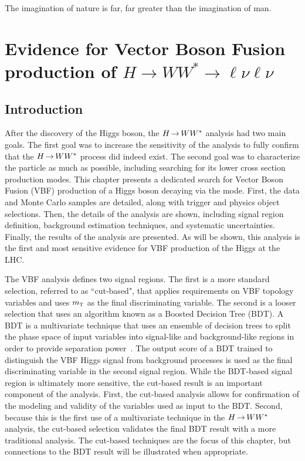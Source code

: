 \begin{savequote}[75mm]
The imagination of nature is far, far greater than the imagination of man.
\end{savequote}

\chapter{Evidence for Vector Boson Fusion production of $H\rightarrow WW^{*}\rightarrow \ell\nu\ell\nu$}

\section{Introduction}

After the discovery of the Higgs boson, the $H{\,{\rightarrow}\,}WW^\ast$ analysis had two main goals. The first goal was to increase the sensitivity of the analysis to fully confirm that the $H{\,{\rightarrow}\,}WW^\ast$ process did indeed exist. The second goal was to characterize the particle as much as possible, including searching for its lower cross section production modes.  This chapter presents a dedicated search for Vector Boson Fusion (VBF) production of a Higgs boson decaying via the \HWWfull mode. First, the data and Monte Carlo samples are detailed, along with trigger and physics object selections. Then, the details of the analysis are shown, including signal region definition, background estimation techniques, and systematic uncertainties. Finally, the results of the analysis are presented. As will be shown, this analysis is the first and most sensitive evidence for VBF production of the Higgs at the LHC.

The VBF \HWWfull analysis defines two signal regions. The first is a more standard selection, referred to as ``cut-based", that applies requirements on  VBF topology variables and uses $m_{\textrm{\footnotesize\sc t}}$ as the final discriminating variable. The second is a looser selection that uses an algorithm known as a Boosted Decision Tree (BDT). A BDT is a multivariate technique that uses an ensemble of decision trees to split the phase space of input variables into signal-like and background-like regions in order to provide separation power~\cite{BDT1,BDT2,BDT3}. The output score of a BDT trained to distinguish the VBF Higgs signal from background processes is used as the final discriminating variable in the second signal region. While the BDT-based signal region is ultimately more sensitive, the cut-based result is an important component of the analysis. First, the cut-based analysis allows for confirmation of the modeling and validity of the variables used as input to the BDT. Second, because this is the first use of a multivariate technique in the $H{\,{\rightarrow}\,}WW^\ast$ analysis, the cut-based selection validates the final BDT result with a more traditional analysis. The cut-based techniques are the focus of this chapter, but connections to the BDT result will be illustrated when appropriate. 

